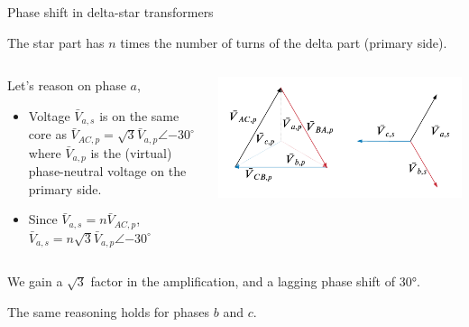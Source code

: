 \begin{frame}{Phase shift in delta-star transformers}

The star part has $n$ times the number of turns of the delta part (primary side).


\begin{columns}
    \begin{column}{0.45\textwidth}
Let's reason on phase $a$,
\begin{itemize}
    \item Voltage $\bar{V}_{a,s}$ is on the same core as $\bar{V}_{AC,p} = \sqrt{3}\bar{V}_{a,p} \angle{-30^\circ}$ where $\bar{V}_{a,p}$ is the (virtual) phase-neutral voltage on the primary side.
    \item Since  $\bar{V}_{a,s} = n \bar{V}_{AC,p}$, $\bar{V}_{a,s} = n\sqrt{3} \bar{V}_{a,p} \angle{-30^\circ}$
\end{itemize}
    \end{column}
    \begin{column}{0.5\textwidth}
\begin{center}
    \includegraphics[width=\textwidth]{images/tfo-delta-star.png}\\
\end{center}
    \end{column}
\end{columns}

We \alert{gain a $\sqrt{3}$ factor} in the amplification, and a \alert{lagging phase shift of 30°}.

The same reasoning holds for phases $b$ and $c$.

\end{frame}

